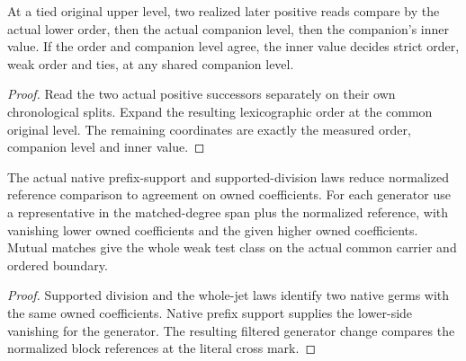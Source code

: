 \begin{theorem}
\label{hir:g1-later-positive-branch-order}
\leanok
At a tied original upper level, two realized later positive
reads compare by the actual lower order, then the actual
companion level, then the companion's inner value. If the
order and companion level agree, the inner value decides
strict order, weak order and ties, at any shared companion level.
\end{theorem}
\begin{proof}
Read the two actual positive successors separately on their own
chronological splits. Expand the resulting lexicographic order
at the common original level. The remaining coordinates are
exactly the measured order, companion level and inner value.
\end{proof}

\begin{theorem}
\label{hir:g1-native-prefix-weight-comparison}
\leanok
The actual native prefix-support and supported-division laws
reduce normalized reference comparison to agreement on owned
coefficients. For each generator use a representative in the
matched-degree span plus the normalized reference, with vanishing
lower owned coefficients and the given higher owned coefficients.
Mutual matches give the whole weak test class on the actual
common carrier and ordered boundary.
\end{theorem}
\begin{proof}
Supported division and the whole-jet laws identify two native
germs with the same owned coefficients. Native prefix support
supplies the lower-side vanishing for the generator. The
resulting filtered generator change compares the normalized
block references at the literal cross mark.
\end{proof}

